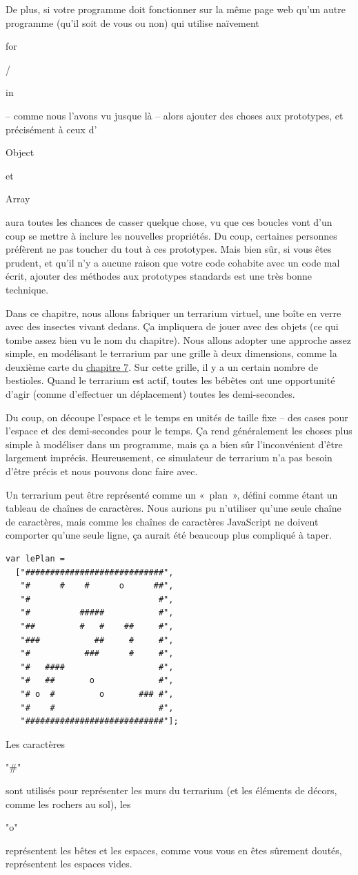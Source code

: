 \documentclass{FramateX}
\renewcommand{\texttt}[1]{\begin{sffamily}{#1}\end{sffamily}}
\begin{document}
De plus, si votre programme doit fonctionner sur la même page web qu'un
autre programme (qu'il soit de vous ou non) qui utilise naïvement
\texttt{for}/\texttt{in} -- comme nous l'avons vu jusque là -- alors
ajouter des choses aux prototypes, et précisément à ceux
d'\texttt{Object} et \texttt{Array} aura toutes les chances de casser
quelque chose, vu que ces boucles vont d'un coup se mettre à inclure les
nouvelles propriétés. Du coup, certaines personnes préfèrent ne pas
toucher du tout à ces prototypes. Mais bien sûr, si vous êtes prudent,
et qu'il n'y a aucune raison que votre code cohabite avec un code mal
écrit, ajouter des méthodes aux prototypes standards est une très bonne
technique.

\begin{center}\end{center}

Dans ce chapitre, nous allons fabriquer un terrarium virtuel, une boîte
en verre avec des insectes vivant dedans. Ça impliquera de jouer avec
des objets (ce qui tombe assez bien vu le nom du chapitre). Nous allons
adopter une approche assez simple, en modélisant le terrarium par une
grille à deux dimensions, comme la deuxième carte du
\href{chapter7.html}{chapitre 7}. Sur cette grille, il y a un certain
nombre de bestioles. Quand le terrarium est actif, toutes les bébêtes
ont une opportunité d'agir (comme d'effectuer un déplacement) toutes les
demi-secondes.

Du coup, on découpe l'espace et le temps en unités de taille fixe -- des
cases pour l'espace et des demi-secondes pour le temps. Ça rend
généralement les choses plus simple à modéliser dans un programme, mais
ça a bien sûr l'inconvénient d'être largement imprécis. Heureusement, ce
simulateur de terrarium n'a pas besoin d'être précis et nous pouvons
donc faire avec.

\begin{center}\end{center}

Un terrarium peut être représenté comme un «~plan~», défini comme étant
un tableau de chaînes de caractères. Nous aurions pu n'utiliser qu'une
seule chaîne de caractères, mais comme les chaînes de caractères
JavaScript ne doivent comporter qu'une seule ligne, ça aurait été
beaucoup plus compliqué à taper.

\begin{lstlisting}
var lePlan =
  ["############################",
   "#      #    #      o      ##",
   "#                          #",
   "#          #####           #",
   "##         #   #    ##     #",
   "###           ##     #     #",
   "#           ###      #     #",
   "#   ####                   #",
   "#   ##       o             #",
   "# o  #         o       ### #",
   "#    #                     #",
   "############################"];
\end{lstlisting}
Les caractères \texttt{"\#"} sont utilisés pour représenter les murs du
terrarium (et les éléments de décors, comme les rochers au sol), les
\texttt{"o"} représentent les bêtes et les espaces, comme vous vous en
êtes sûrement doutés, représentent les espaces vides.
\end{document}
